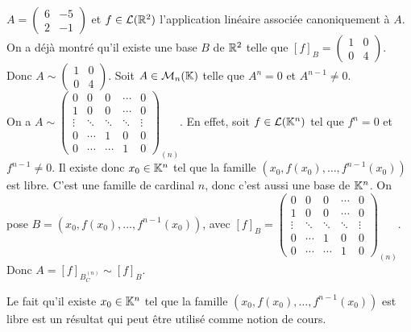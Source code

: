 \documentclass[12pt, a4paper]{report}
\begin{document}
\begin{example}
    \begin{outline}
        \1 $A = \left(\begin{matrix} 6 & -5 \\ 2 & -1 \end{matrix}\right)$ et $f \in \mathcal L(\mathbb{R}^2)$ l'application linéaire associée canoniquement à $A$. On a déjà montré qu'il existe une base $B$ de $\mathbb{R}^2$ telle que $[f]_B = \left(\begin{matrix} 1 & 0 \\ 0 & 4 \end{matrix}\right)$. Donc $A \sim \left(\begin{matrix} 1 & 0 \\ 0 & 4 \end{matrix}\right)$.
        \1 Soit $A \in \mathcal M_n(\mathbb{K})$ telle que $A^n = 0$ et $A^{n-1} \ne 0$.\\On a $A \sim \left(\begin{matrix} 0 & 0 & 0 & \cdots & 0 \\ 1 & 0 & 0 & \cdots & 0 \\ \vdots & \ddots & \ddots & \ddots & \vdots \\ 0 & \cdots & 1 & 0 & 0 \\ 0 & \cdots & \cdots & 1 & 0 \end{matrix}\right)_{(n)}$.
        \2 En effet, soit $f \in \mathcal L(\mathbb{K}^n)$ tel que $f^n = 0$ et $f^{n-1} \ne 0$. Il existe donc $x_0 \in \mathbb{K}^n$ tel que la famille $(x_0, f(x_0), \ldots, f^{n-1}(x_0))$ est libre.
        \2 C'est une famille de cardinal $n$, donc c'est aussi une base de $\mathbb{K}^n$. 
        \2 On pose $B = (x_0, f(x_0), \ldots, f^{n-1}(x_0))$, avec $[f]_B = \left(\begin{matrix} 0 & 0 & 0 & \cdots & 0 \\ 1 & 0 & 0 & \cdots & 0 \\ \vdots & \ddots & \ddots & \ddots & \vdots \\ 0 & \cdots & 1 & 0 & 0 \\ 0 & \cdots & \cdots & 1 & 0 \end{matrix}\right)_{(n)}$.
        \2 Donc $A = [f]_{B_C^{(n)}} \sim [f]_B$.
    \end{outline}
\end{example}

\begin{methodbox}
    Le fait qu'il existe $x_0 \in \mathbb{K}^n$ tel que la famille $(x_0, f(x_0), \ldots, f^{n-1}(x_0))$ est libre est un résultat qui peut être utilisé comme notion de cours.
\end{methodbox}
\end{document}
